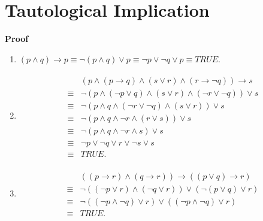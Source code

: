 \documentclass{../../cls/sig-alternate-05-2015}
\begin{document}
\section{Tautological Implication}
\textbf{Proof}\begin{enumerate}[label=(\alph*)]
\item $(p \land q) \rightarrow p \equiv \lnot (p \land q) \lor p \equiv \lnot p \lor \lnot q \lor p \equiv TRUE$.
\item \begin{align}
    \begin{aligned}
    & (p \land (p \rightarrow q) \land (s \lor r) \land (r \rightarrow \lnot q)) \rightarrow s\\
    \equiv & \lnot (p \land (\lnot p \lor q) \land (s \lor r) \land (\lnot r \lor \lnot q)) \lor s\\
    \equiv & \lnot (p \land q \land (\lnot r \lor \lnot q) \land (s \lor r)) \lor s\\
    \equiv & \lnot (p \land q \land \lnot r \land (r \lor s)) \lor s\\
    \equiv & \lnot (p \land q \land \lnot r \land s) \lor s\\ \equiv & \lnot p \lor \lnot q \lor r \lor \lnot s \lor s\\
    \equiv & TRUE.
    \end{aligned}
\end{align}
\item \begin{align}
    \begin{aligned}
    & ((p \rightarrow r) \land (q \rightarrow r)) \rightarrow ((p \lor q) \rightarrow r)\\
    \equiv & \lnot ((\lnot p \lor r) \land (\lnot q \lor r)) \lor (\lnot (p \lor q) \lor r)\\
    \equiv & \lnot ((\lnot p \land \lnot q) \lor r) \lor ((\lnot p \land \lnot q) \lor r)\\
    \equiv & TRUE.
    \end{aligned}
\end{align}
\end{enumerate}
\end{document}
